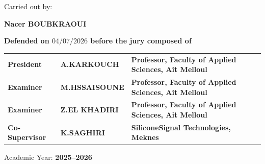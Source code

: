 \documentclass[11pt,a4paper,openany]{book}
\begin{document}
\begin{titlepage}
\vspace{15mm}
\centerline{Carried out by:}

\centerline{\small \bf Nacer BOUBKRAOUI}
\vspace{5mm}
\centerline{\small \bf Defended on $04/07/2026$ before the jury composed of}

\hskip-10mm
\begin{center}
\begin{tabular}{lll}
   \bf{\hspace{-3mm}President} & \bf{A.KARKOUCH} & \bf{Professor, Faculty of Applied Sciences, Ait Melloul}\\
   \bf{\hspace{-3mm}Examiner}       & \bf{M.HSSAISOUNE} & \bf{Professor, Faculty of Applied Sciences, Ait Melloul}\\
   \bf{\hspace{-3mm}Examiner}       & \bf{Z.EL KHADIRI} & \bf{Professor, Faculty of Applied Sciences, Ait Melloul}\\
   \bf{\hspace{-3mm}Co-Supervisor}  & \bf{K.SAGHIRI} & \bf{SiliconeSignal Technologies, Meknes}
\end{tabular}
\end{center}

\vskip1.5cm
{\small Academic Year: \textbf{2025--2026}}

\vspace*{\fill}
\end{titlepage}
\thispagestyle{empty}

\frontmatter



\tableofcontents
\listoffigures
\listoftables


\mainmatter



\end{document}
